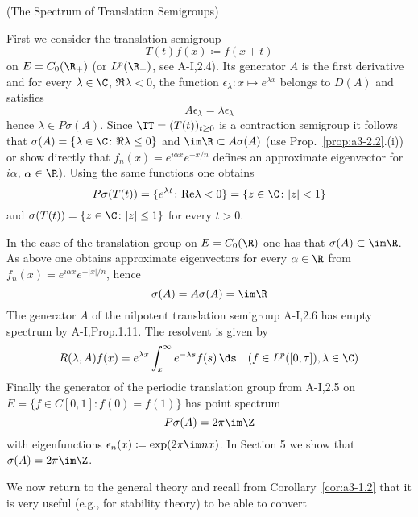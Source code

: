 \begin{example}\label{ex:a3-2.4}{(The Spectrum of Translation Semigroups)}
%

First we consider the translation semigroup
\[
T(t)f(x) \coloneqq f(x+t)
\]
on $E = C_{0}(\R_{+})$ (or $L^{p}(\R_{+})$, see A-I,2.4).
Its generator $A$ is the first derivative and for every $\lambda \in \C$, $\Re\lambda < 0$, the function $\epsilon_{\lambda} \colon x \mapsto e^{\lambda x}$ belongs to $D(A)$ and satisfies
\[
A\epsilon_{\lambda} = \lambda\epsilon_{\lambda}
\]
hence $\lambda \in P\sigma(A)$.
Since $\TT = (T(t))_{t \geq 0}$ is a contraction semigroup it follows that $\sigma(A) = \{\lambda \in \C \colon \Re \lambda \leq 0\}$ and $\im\R \subset A\sigma(A)$ (use Prop.~\ref{prop:a3-2.2}.(i)) or show directly that $f_{n}(x) = e^{i\alpha x}e^{-x/n}$ defines an approximate eigenvector for $i\alpha$, $\alpha \in \R$).
Using the same functions one obtains
\[
P\sigma(T(t)) = \{e^{\lambda t} \colon \text{Re}\lambda < 0\} = \{z \in \C \colon |z| < 1\}
\]
and $\sigma(T(t)) = \{z \in \C \colon |z| \leq 1\}$ for every $t > 0$.

In the case of the translation group on $E = C_{0}(\R)$ one has that $\sigma(A) \subset \im\R$.
As above one obtains approximate eigenvectors for every $\alpha \in \R$ from $f_{n}(x) = e^{i\alpha x}e^{-|x|/n}$, hence
\[
\sigma(A) = A\sigma(A) = \im\R
\]
The generator $A$ of the nilpotent translation semigroup A-I,2.6 has empty spectrum by A-I,Prop.1.11.
The resolvent is given by
\[
R(\lambda,A)f(x) = e^{\lambda x}\int_{x}^{\infty}e^{-\lambda s}f(s) \, \ds \quad (f \in L^{p}([0,\tau]), \lambda \in \C)
\]
Finally the generator of the periodic translation group from A-I,2.5 on $E = \{f \in C[0,1] \colon f(0) = f(1)\}$ has point spectrum
\[
P\sigma(A) = 2\pi \im\Z
\]
with eigenfunctions $\epsilon_{n}(x) \coloneqq \exp(2\pi \im n x)$.
In Section 5 we show that $\sigma(A) = 2\pi \im\Z$.
\end{example}

We now return to the general theory and recall from Corollary~\ref{cor:a3-1.2} that it is very useful (e.g., for stability theory) to be able to convert



